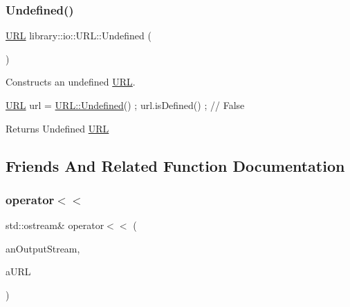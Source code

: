 \subsubsection{\texorpdfstring{Undefined()}{Undefined()}}
{\footnotesize\ttfamily \hyperlink{classlibrary_1_1io_1_1_u_r_l}{U\+RL} library\+::io\+::\+U\+R\+L\+::\+Undefined (\begin{DoxyParamCaption}{ }\end{DoxyParamCaption})\hspace{0.3cm}{\ttfamily [static]}}



Constructs an undefined \hyperlink{classlibrary_1_1io_1_1_u_r_l}{U\+RL}. 


\begin{DoxyCode}
\hyperlink{classlibrary_1_1io_1_1_u_r_l_a7e9c070138a6dbd000ffb10b7cd8a5c4}{URL} url = \hyperlink{classlibrary_1_1io_1_1_u_r_l_a10de2711247d54ec4dbaf317a0b2ab2c}{URL::Undefined}() ;
url.isDefined() ; \textcolor{comment}{// False}
\end{DoxyCode}


\begin{DoxyReturn}{Returns}
Undefined \hyperlink{classlibrary_1_1io_1_1_u_r_l}{U\+RL} 
\end{DoxyReturn}


\subsection{Friends And Related Function Documentation}
\mbox{\label{classlibrary_1_1io_1_1_u_r_l_a98ed4737303253c4105846425180fc30}} 
\subsubsection{\texorpdfstring{operator$<$$<$}{operator<<}}
{\footnotesize\ttfamily std\+::ostream\& operator$<$$<$ (\begin{DoxyParamCaption}\item[{std\+::ostream \&}]{an\+Output\+Stream,  }\item[{const \hyperlink{classlibrary_1_1io_1_1_u_r_l}{U\+RL} \&}]{a\+U\+RL }\end{DoxyParamCaption})\hspace{0.3cm}{\ttfamily [friend]}}



